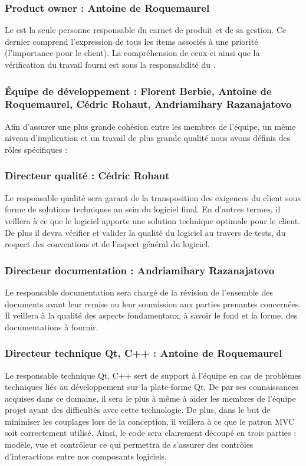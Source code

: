 \subsubsection{Product owner : Antoine de Roquemaurel}
Le  est la seule personne responsable du carnet de produit et de sa gestion. Ce dernier comprend l’expression de tous les items associés
à une priorité (l'importance pour le client). La compréhension de ceux-ci ainsi que la vérification du travail fourni est sous la responsabilité du
.
\subsubsection{Équipe de développement : Florent Berbie, Antoine de Roquemaurel, Cédric Rohaut, Andriamihary Razanajatovo}
Afin d’assurer une plus grande cohésion entre les membres de l’équipe, un même niveau d’implication et un travail de plus grande qualité nous avons
définis des rôles spécifiques : 
\subsubsection{Directeur qualité : Cédric Rohaut}
Le responsable qualité sera garant de la transposition des exigences du client sous forme de solutions techniques au sein du logiciel final. En
d’autres termes, il veillera à ce que le logiciel apporte une solution technique optimale pour le client. De plus il devra vérifier et valider la
qualité du logiciel au travers de tests, du respect des conventions et de l'aspect général du logiciel.

\subsubsection{Directeur documentation : Andriamihary Razanajatovo}
Le responsable documentation sera chargé de la révision de l'ensemble des documents avant leur remise ou leur soumission aux parties prenantes
concernées. Il veillera à la qualité des aspects fondamentaux, à savoir le fond et la forme, des documentations à fournir.

\subsubsection{Directeur technique Qt, C++ : Antoine de Roquemaurel}
Le responsable technique Qt, C++ sert de support à l'équipe en cas de problèmes techniques liés au développement sur la plate-forme Qt. De par ses
connaissances acquises dans ce domaine, il sera le plus à même à aider les membres de l'équipe projet ayant des difficultés avec cette technologie.
De plus, dans le but de minimiser les couplages lors de la conception, il veillera à ce que le patron MVC soit correctement utilisé. Ainsi, le code
sera clairement découpé en trois parties : modèle, vue et contrôleur ce qui permettra de s’assurer des contrôles d'interactions entre nos composants
logiciels.


